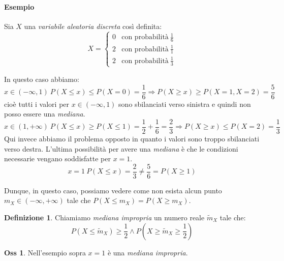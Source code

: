 \documentclass[12pt, a4paper]{report}
\theoremstyle{definition}
\newtheorem{definition}{Definizione}[section]
\newtheorem*{observation}{Oss}
\begin{document}
\paragraph*{Esempio}
Sia $X$ una \emph{variabile aleatoria discreta} così definita:
\[X=\begin{cases}
	{0} & \text{con probabilità}\ {\frac{1}{6}}\\
	{2} & \text{con probabilità}\ {\frac{1}{1}}\\
	{2} & \text{con probabilità}\ {\frac{1}{3}}
\end{cases}\]
\begin{center}
\end{center}

In questo caso abbiamo:
\[x\in(-\infty, 1)\ P(X\leq x)\leq P(X=0)=\frac{1}{6} \Rightarrow P(X\geq x)\geq
P(X=1,X=2)=\frac{5}{6}\]
cioè tutti i valori per \(x\in(-\infty,1)\) sono sbilanciati verso sinistra e
quindi non posso essere una \emph{mediana}.
\[x\in(1,+\infty)\ P(X\leq x)\geq P(X\leq 1)=\frac{1}{2}+\frac{1}{6}=\frac{2}{3}
\Rightarrow P(X\geq x)\leq P(X=2)=\frac{1}{3}\]
Qui invece abbiamo il problema opposto in quanto i valori sono troppo sbilanciati
verso destra. L'ultima possibilità per avere una \emph{mediana} è che le condizioni
necessarie vengano soddisfatte per $x=1$.
\[x=1\ P(X\leq x)=\frac{2}{3}\neq\frac{5}{6}=P(X\geq 1)\]

Dunque, in questo caso, possiamo vedere come non esista alcun punto
\(m_X\in(-\infty,+\infty)\) tale che \(P(X\leq m_X)=P(X\geq m_X)\).

\begin{definition}
	Chiamiamo \emph{mediana impropria} un numero reale $\tilde{m}_X$ tale che:
	\[P(X\leq\tilde{m}_X)\geq\frac{1}{2}\wedge P(X\geq\tilde{m}_X\geq\frac{1}{2})\]
\end{definition}
\begin{observation}
	Nell'esempio sopra $x=1$ è una \emph{mediana impropria}.
\end{observation}
\end{document}
